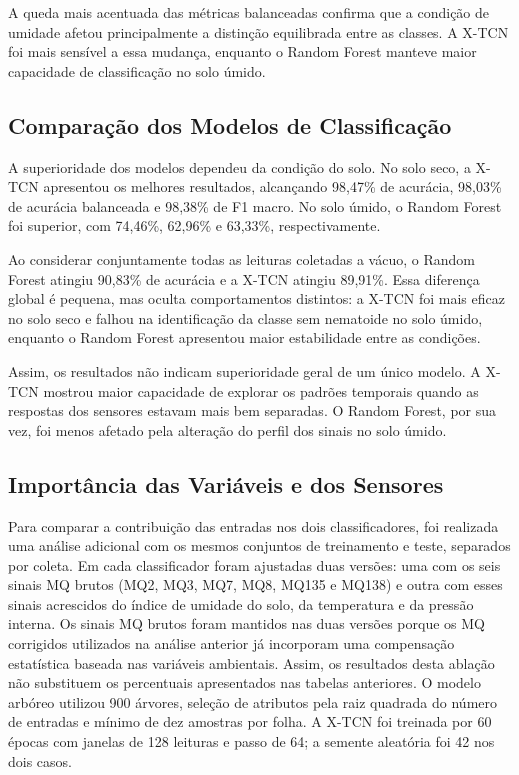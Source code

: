 A queda mais acentuada das métricas balanceadas confirma que a condição de
umidade afetou principalmente a distinção equilibrada entre as classes. A
X-TCN foi mais sensível a essa mudança, enquanto o Random Forest manteve maior
capacidade de classificação no solo úmido.

\subsection{Comparação dos Modelos de Classificação}

A superioridade dos modelos dependeu da condição do solo. No solo seco, a
X-TCN apresentou os melhores resultados, alcançando 98,47\% de acurácia,
98,03\% de acurácia balanceada e 98,38\% de F1 macro. No solo úmido, o Random
Forest foi superior, com 74,46\%, 62,96\% e 63,33\%, respectivamente.

Ao considerar conjuntamente todas as leituras coletadas a vácuo, o Random
Forest atingiu 90,83\% de acurácia e a X-TCN atingiu 89,91\%. Essa diferença
global é pequena, mas oculta comportamentos distintos: a X-TCN foi mais eficaz
no solo seco e falhou na identificação da classe sem nematoide no solo úmido,
enquanto o Random Forest apresentou maior estabilidade entre as condições.

Assim, os resultados não indicam superioridade geral de um único modelo. A
X-TCN mostrou maior capacidade de explorar os padrões temporais quando as
respostas dos sensores estavam mais bem separadas. O Random Forest, por sua
vez, foi menos afetado pela alteração do perfil dos sinais no solo úmido.

\subsection{Importância das Variáveis e dos Sensores}

Para comparar a contribuição das entradas nos dois classificadores, foi
realizada uma análise adicional com os mesmos conjuntos de treinamento e teste,
separados por coleta. Em cada classificador foram ajustadas duas versões: uma
com os seis sinais MQ brutos (MQ2, MQ3, MQ7, MQ8, MQ135 e MQ138) e outra com
esses sinais acrescidos do índice de umidade do solo, da temperatura e da
pressão interna. Os sinais MQ brutos foram mantidos nas duas versões porque os
MQ corrigidos utilizados na análise anterior já incorporam uma compensação
estatística baseada nas variáveis ambientais. Assim, os resultados desta
ablação não substituem os percentuais apresentados nas tabelas anteriores.
O modelo arbóreo utilizou 900 árvores, seleção de atributos pela raiz
quadrada do número de entradas e mínimo de dez amostras por folha. A X-TCN
foi treinada por 60 épocas com janelas de 128 leituras e passo de 64; a
semente aleatória foi 42 nos dois casos.

